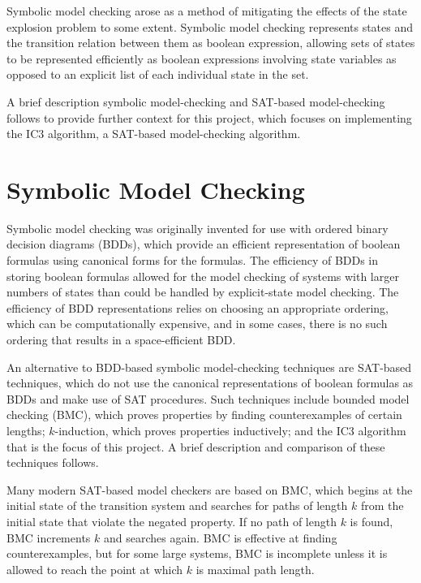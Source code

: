 \documentclass[12pt,a4paper,twoside,openright]{report}
\begin{document}
Symbolic model checking arose as a method of mitigating the effects of
the state explosion problem to some extent. Symbolic model checking
represents states and the transition relation between them as boolean
expression, allowing sets of states to be represented efficiently
as boolean expressions involving state variables as opposed to an
explicit list of each individual state in the set. 

A brief description symbolic model-checking and SAT-based model-checking
follows to provide further context for this project, which focuses on implementing
the IC3 algorithm, a SAT-based model-checking algorithm.


\section{Symbolic Model Checking}


Symbolic model checking was originally invented for use with ordered
binary decision diagrams (BDDs), which provide an efficient representation
of boolean formulas using canonical forms for the formulas.
The efficiency of BDDs in storing boolean formulas allowed for the model
checking of systems with larger numbers of states than could be handled
by explicit-state model checking. %
The efficiency of BDD representations relies on choosing an appropriate
ordering, which can be computationally expensive, and in some cases,
there is no such ordering that results in a space-efficient BDD.

An alternative to BDD-based symbolic model-checking techniques are SAT-based
techniques, which do not use the canonical representations of boolean formulas as
BDDs and make use of SAT procedures. Such techniques include bounded
model checking (BMC), which proves properties by finding counterexamples of certain
lengths; $k$-induction, which proves properties inductively; and the IC3 algorithm
that is the focus of this project. A brief description and comparison of these techniques
follows.

Many modern SAT-based model checkers are based on BMC, which begins at the
initial state of the transition system and searches for paths of length
$k$ from the initial state that violate the negated property. If no path of length $k$
is found, BMC increments $k$ and searches again. BMC is effective at finding
counterexamples, but for some large systems, BMC is incomplete unless it is allowed
to reach the point at which $k$ is maximal path length.
\end{document}

